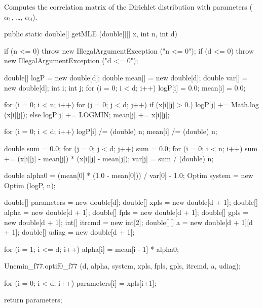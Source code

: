 \begin{tabb}
   Computes the correlation matrix of the Dirichlet distribution
   with parameters ($\alpha_1$, \ldots, $\alpha_d$).
\end{tabb}
\begin{code}

   public static double[] getMLE (double[][] x, int n, int d)\begin{hide} {
      if (n <= 0)
         throw new IllegalArgumentException ("n <= 0");
      if (d <= 0)
         throw new IllegalArgumentException ("d <= 0");

      double[] logP = new double[d];
      double mean[] = new double[d];
      double var[] = new double[d];
      int i;
      int j;
      for (i = 0; i < d; i++) {
         logP[i] = 0.0;
         mean[i] = 0.0;
      }

      for (i = 0; i < n; i++) {
         for (j = 0; j < d; j++) {
            if (x[i][j] > 0.)
               logP[j] += Math.log (x[i][j]);
            else
               logP[j] += LOGMIN;
            mean[j] += x[i][j];
         }
      }

      for (i = 0; i < d; i++) {
         logP[i] /= (double) n;
         mean[i] /= (double) n;
      }

      double sum = 0.0;
      for (j = 0; j < d; j++) {
         sum = 0.0;
         for (i = 0; i < n; i++)
            sum += (x[i][j] - mean[j]) * (x[i][j] - mean[j]);
         var[j] = sum / (double) n;
      }

      double alpha0 = (mean[0] * (1.0 - mean[0])) / var[0] - 1.0;
      Optim system = new Optim (logP, n);

      double[] parameters = new double[d];
      double[] xpls = new double[d + 1];
      double[] alpha = new double[d + 1];
      double[] fpls = new double[d + 1];
      double[] gpls = new double[d + 1];
      int[] itrcmd = new int[2];
      double[][] a = new double[d + 1][d + 1];
      double[] udiag = new double[d + 1];

      for (i = 1; i <= d; i++)
         alpha[i] = mean[i - 1] * alpha0;

      Uncmin_f77.optif0_f77 (d, alpha, system, xpls, fpls, gpls, itrcmd, a, udiag);

      for (i = 0; i < d; i++)
         parameters[i] = xpls[i+1];

      return parameters;
   }\end{hide}
\end{code}
